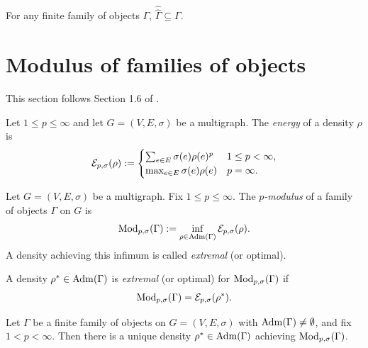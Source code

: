 \begin{theorem}
\label{thm:fulkerson-duality}
For any finite family of objects $\Gamma$, $\widehat{\widehat\Gamma} \subseteq \Gamma$.
\end{theorem}

\section{Modulus of families of objects}

This section follows Section 1.6 of \feupaperref{}.

\begin{definition}
\label{def:energy}
Let $1 \le p \le \infty$ and let $G = (V, E, \sigma)$ be a multigraph. The \emph{energy} of a density $\rho$ is
\[
  \mathcal{E}_{p,\sigma}(\rho) := 
  \begin{cases}
    \sum_{e \in E} \sigma(e) \rho(e)^p & 1 \le p < \infty, \\
    \max_{e \in E} \sigma(e) \rho(e) & p = \infty.
  \end{cases}
\]
\end{definition}

\begin{definition}[$p$-modulus]
\label{def:modulus}
Let $G = (V, E, \sigma)$ be a multigraph.
Fix $1 \le p \le \infty$. The \emph{$p$-modulus} of a family of objects $\Gamma$
on $G$ is
\[
  \operatorname{Mod}_{p,\sigma}(\Gamma) := \inf_{\rho \in \operatorname{Adm}(\Gamma)} \mathcal{E}_{p,\sigma}(\rho).
\]
A density achieving this infimum is called \emph{extremal} (or optimal).
\end{definition}

\begin{definition}
\label{def:extremal-density}
A density $\rho^* \in \operatorname{Adm}(\Gamma)$ is \emph{extremal} (or optimal) for $\operatorname{Mod}_{p,\sigma}(\Gamma)$ if
\[
  \operatorname{Mod}_{p,\sigma}(\Gamma) = \mathcal{E}_{p,\sigma}(\rho^*).
\]
\end{definition}

\begin{theorem}
\label{thm:modulus-extremal-unique}
\notready
Let $\Gamma$ be a finite family of objects on $G = (V, E, \sigma)$ with
$\operatorname{Adm}(\Gamma) \ne \emptyset$, and fix $1 < p < \infty$. Then there is a unique
density $\rho^* \in \operatorname{Adm}(\Gamma)$ achieving $\operatorname{Mod}_{p,\sigma}(\Gamma)$.
\end{theorem}

